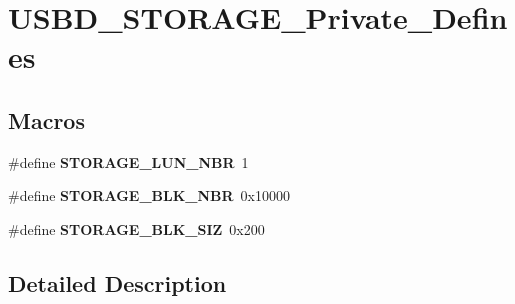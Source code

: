 \hypertarget{group___u_s_b_d___s_t_o_r_a_g_e___private___defines}{}\section{U\+S\+B\+D\+\_\+\+S\+T\+O\+R\+A\+G\+E\+\_\+\+Private\+\_\+\+Defines}
\label{group___u_s_b_d___s_t_o_r_a_g_e___private___defines}
\subsection*{Macros}
\begin{DoxyCompactItemize}
\item 
\mbox{\label{group___u_s_b_d___s_t_o_r_a_g_e___private___defines_gabb8a7943a09d00d6876fb27f6530aa7a}} 
\#define {\bfseries S\+T\+O\+R\+A\+G\+E\+\_\+\+L\+U\+N\+\_\+\+N\+BR}~1
\item 
\mbox{\label{group___u_s_b_d___s_t_o_r_a_g_e___private___defines_gad22c8c07ae0bcd7d027cd418844e820a}} 
\#define {\bfseries S\+T\+O\+R\+A\+G\+E\+\_\+\+B\+L\+K\+\_\+\+N\+BR}~0x10000
\item 
\mbox{\label{group___u_s_b_d___s_t_o_r_a_g_e___private___defines_ga601665b81fc3951defd6ef97cc9f35f3}} 
\#define {\bfseries S\+T\+O\+R\+A\+G\+E\+\_\+\+B\+L\+K\+\_\+\+S\+IZ}~0x200
\end{DoxyCompactItemize}


\subsection{Detailed Description}
